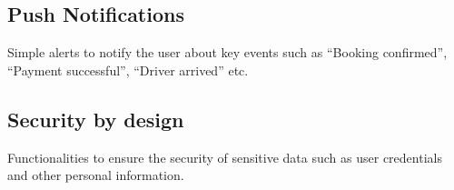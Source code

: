 \documentclass{article}
\begin{document}
\subsection{Push Notifications}
Simple alerts to notify the user about key events such as “Booking confirmed”, “Payment successful”, “Driver arrived” etc.

\subsection{Security by design}
Functionalities to ensure the security of sensitive data such as user credentials and other personal information.
\end{document}
